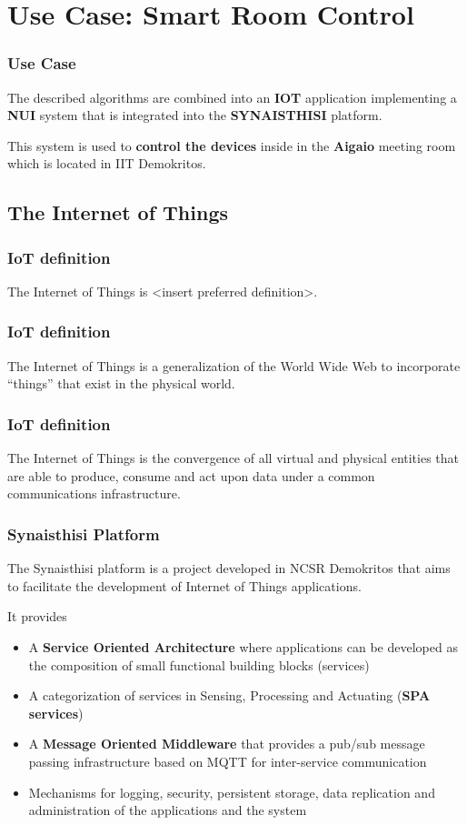 \section{Use Case: Smart Room Control}

\begin{frame}
\frametitle{Use Case}

The described algorithms are combined into an \textbf{IOT} application implementing a \textbf{NUI} system that is integrated into the \textbf{SYNAISTHISI} platform.

This system is used to \textbf{control the devices} inside in the \textbf{Aigaio} meeting room which is located in IIT Demokritos.

\end{frame}

\subsection{The Internet of Things}


\begin{frame}
\frametitle{IoT definition}
The Internet of Things is <insert preferred definition>.
\end{frame}


\begin{frame}
\frametitle{IoT definition}
The Internet of Things is a generalization of the World Wide Web to incorporate ``things'' that exist in the physical world. 
\end{frame}

\begin{frame}
\frametitle{IoT definition}
The Internet of Things is the convergence of all virtual and physical entities that are able to produce, consume and act upon data under a common communications infrastructure.
\end{frame}

\begin{frame}
\frametitle{Synaisthisi Platform}
The Synaisthisi platform is a project developed in NCSR Demokritos that aims to facilitate the development of Internet of Things applications.

It provides
\begin{itemize}
\item A \textbf{Service Oriented Architecture} where applications can be developed as the composition of small functional building blocks (services) 
\item A categorization of services in Sensing, Processing and Actuating (\textbf{SPA services})
\item A \textbf{Message Oriented Middleware} that provides a pub/sub message passing infrastructure based on MQTT for inter-service communication
\item Mechanisms for logging, security, persistent storage, data replication and administration of the applications and the system
\end{itemize}
\end{frame}


